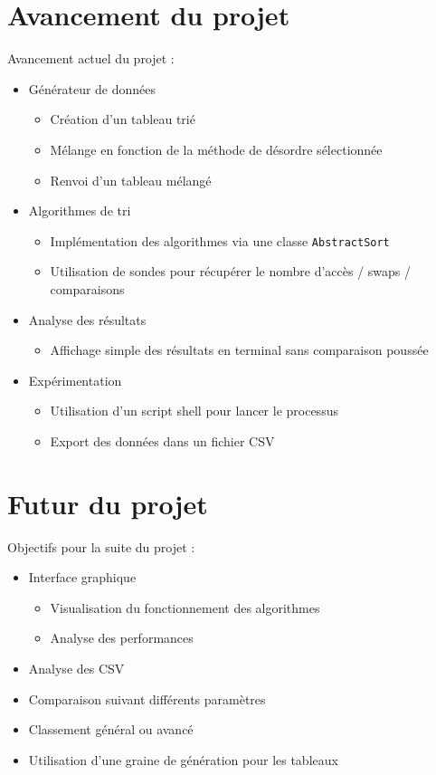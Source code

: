 \documentclass[10pt]{beamer}
\begin{document}
\section{Avancement du projet}
\begin{frame}
Avancement actuel du projet :
  \begin{itemize}
    \item <1-> Générateur de données 
      \begin{itemize}
        \item Création d’un tableau trié 
        \item Mélange en fonction de la méthode de désordre sélectionnée 
        \item Renvoi d’un tableau mélangé  
      \end{itemize}
    \item <2-> Algorithmes de tri 
        \begin{itemize}
          \item Implémentation des algorithmes via une classe \texttt{AbstractSort}
          \item Utilisation de sondes pour récupérer le nombre d’accès / swaps / comparaisons
        \end{itemize}
    \item <3-> Analyse des résultats
      \begin{itemize}
        \item Affichage simple des résultats en terminal sans comparaison poussée
      \end{itemize}
    \item <3-> Expérimentation
      \begin{itemize}
        \item Utilisation d’un script shell pour lancer le processus 
        \item Export des données dans un fichier CSV
      \end{itemize}
  \end{itemize}
\end{frame}

\section{Futur du projet}
\begin{frame}
Objectifs pour la suite du projet :
  \begin{itemize}
    \item Interface graphique 
    \begin{itemize}
      \item Visualisation du fonctionnement des algorithmes 
      \item Analyse des performances
    \end{itemize}
    \item Analyse des CSV
    \item Comparaison suivant différents paramètres
    \item Classement général ou avancé
    \item Utilisation d'une graine de génération pour les tableaux
  \end{itemize}
\end{frame}
\end{document}
